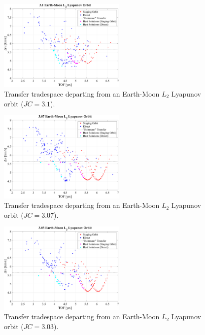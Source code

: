 \begin{figure}[ht]
    \centering
    \includegraphics[width=0.55\textwidth]{figures/TradeSpace_L2Lyapunov_3_10.pdf}
    \caption{Transfer tradespace departing from an Earth-Moon $L_{2}$ Lyapunov orbit ($JC=3.1$).}
\end{figure}
\clearpage

\begin{figure}[ht]
    \centering
    \includegraphics[width=0.55\textwidth]{figures/TradeSpace_L2Lyapunov_3_07.pdf}
    \caption{Transfer tradespace departing from an Earth-Moon $L_{2}$ Lyapunov orbit ($JC=3.07$).}
\end{figure}

\begin{figure}[ht]
    \centering
    \includegraphics[width=0.55\textwidth]{figures/TradeSpace_L2Lyapunov_3_03.pdf}
    \caption{Transfer tradespace departing from an Earth-Moon $L_{2}$ Lyapunov orbit ($JC=3.03$).}
\end{figure}
\clearpage

